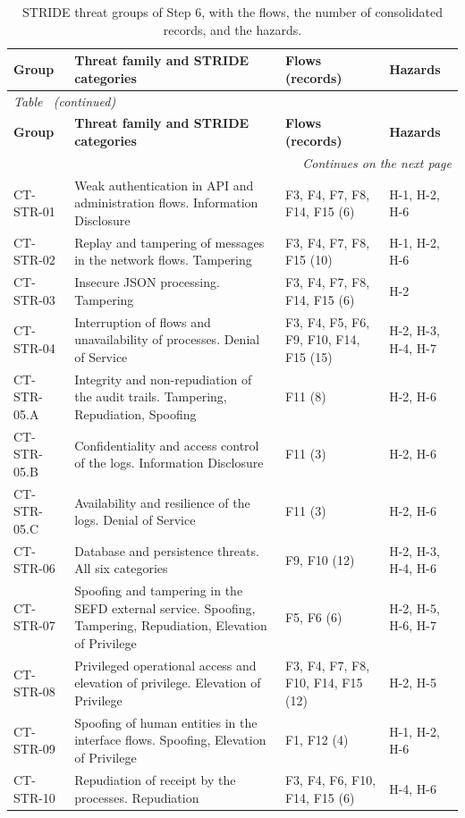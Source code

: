 \begin{longtable}{l p{} p{} p{}}
    \caption[STRIDE threat groups of Step 6]{STRIDE threat groups of Step 6, with the flows, the number of consolidated records, and the hazards.}
    \label{tab:apxB_grupos} \\
    \hline
    \textbf{Group} & \textbf{Threat family and STRIDE categories} & \textbf{Flows (records)} & \textbf{Hazards} \\
    \hline
    \endfirsthead
    \multicolumn{4}{l}{\small\emph{Table~\thetable{} (continued)}} \\
    \hline
    \textbf{Group} & \textbf{Threat family and STRIDE categories} & \textbf{Flows (records)} & \textbf{Hazards} \\
    \hline
    \endhead
    \hline
    \multicolumn{4}{r}{\small\emph{Continues on the next page}} \\
    \endfoot
    \hline
    \endlastfoot
        CT-STR-01 & Weak authentication in API and administration flows. Information Disclosure & F3, F4, F7, F8, F14, F15 (6) & H-1, H-2, H-6 \\[0.4em]
        CT-STR-02 & Replay and tampering of messages in the network flows. Tampering & F3, F4, F7, F8, F15 (10) & H-1, H-2, H-6 \\[0.4em]
        CT-STR-03 & Insecure JSON processing. Tampering & F3, F4, F7, F8, F14, F15 (6) & H-2 \\[0.4em]
        CT-STR-04 & Interruption of flows and unavailability of processes. Denial of Service & F3, F4, F5, F6, F9, F10, F14, F15 (15) & H-2, H-3, H-4, H-7 \\[0.4em]
        CT-STR-05.A & Integrity and non-repudiation of the audit trails. Tampering, Repudiation, Spoofing & F11 (8) & H-2, H-6 \\[0.4em]
        CT-STR-05.B & Confidentiality and access control of the logs. Information Disclosure & F11 (3) & H-2, H-6 \\[0.4em]
        CT-STR-05.C & Availability and resilience of the logs. Denial of Service & F11 (3) & H-2, H-6 \\[0.4em]
        CT-STR-06 & Database and persistence threats. All six categories & F9, F10 (12) & H-2, H-3, H-4, H-6 \\[0.4em]
        CT-STR-07 & Spoofing and tampering in the SEFD external service. Spoofing, Tampering, Repudiation, Elevation of Privilege & F5, F6 (6) & H-2, H-5, H-6, H-7 \\[0.4em]
        CT-STR-08 & Privileged operational access and elevation of privilege. Elevation of Privilege & F3, F4, F7, F8, F10, F14, F15 (12) & H-2, H-5 \\[0.4em]
        CT-STR-09 & Spoofing of human entities in the interface flows. Spoofing, Elevation of Privilege & F1, F12 (4) & H-1, H-2, H-6 \\[0.4em]
        CT-STR-10 & Repudiation of receipt by the processes. Repudiation & F3, F4, F6, F10, F14, F15 (6) & H-4, H-6 \\
\end{longtable}

